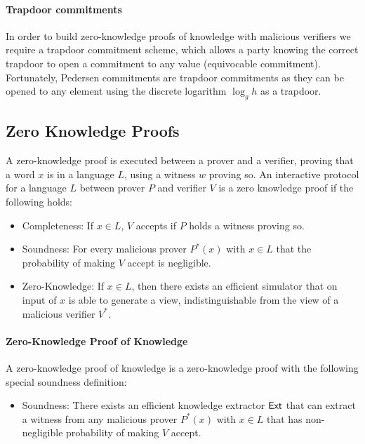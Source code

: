 \paragraph{Trapdoor commitments}
In order to build zero-knowledge proofs of knowledge with malicious verifiers we require a trapdoor commitment scheme, which allows a party knowing the correct trapdoor to open a commitment to any value (equivocable commitment).
Fortunately, Pedersen commitments are trapdoor commitments as they can be opened to any element using the discrete logarithm $\log_g h$ as a trapdoor.

\subsection{Zero Knowledge Proofs}
A zero-knowledge proof is executed between a prover and a verifier, proving that a word $x$ is in a language $L$, using a witness $w$ proving so.
An interactive protocol \ZKP for a language $L$ between prover $P$ and verifier $V$ is a zero knowledge proof if the following holds:
\begin{itemize}
	\item Completeness: If $x\in L$, $V$ accepts if $P$ holds a witness proving so.
	\item Soundness: For every malicious prover $P^\ast(x)$ with $x\in L$ that the probability of making $V$ accept is negligible.
	\item Zero-Knowledge: If $x\in L$, then there exists an efficient simulator \Sim that on input of $x$ is able to generate a view, indistinguishable from the view of a malicious verifier $V^\ast$.
\end{itemize}

\paragraph{Zero-Knowledge Proof of Knowledge}
A zero-knowledge proof of knowledge \ZKPoK is a zero-knowledge proof with the following special soundness definition:
\begin{itemize}
	\item Soundness: There exists an efficient knowledge extractor $\mathsf{Ext}$ that can extract a witness from any malicious prover $P^*(x)$ with $x\in L$ that has non-negligible probability of making $V$ accept.
\end{itemize}

